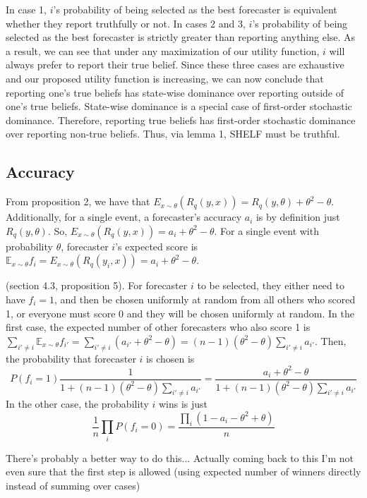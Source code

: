 \documentclass[letterpaper,12pt]{article}
\newcommand{\E}{\mathbb{E}}
\newcommand{\1}{\mathbbm{1}}
\begin{document}
In case 1, $i$'s probability of being selected as the best forecaster is equivalent whether they report truthfully or not. In cases 2 and 3, $i$'s probability of being selected as the best forecaster is strictly greater than reporting anything else. As a result, we can see that under any maximization of our utility function, $i$ will always prefer to report their true belief. Since these three cases are exhaustive and our proposed utility function is increasing, we can now conclude that reporting one's true beliefs has state-wise dominance over reporting outside of one's true beliefs. State-wise dominance is a special case of first-order stochastic dominance. Therefore, reporting true beliefs has first-order stochastic dominance over reporting non-true beliefs. Thus, via lemma 1, SHELF must be truthful.

\subsection{Accuracy}

From proposition 2, we have that $E_{x \sim \theta}(R_q(y, x)) = R_q(y, \theta) + \theta^2 - \theta$. Additionally, for a single event, a forecaster's accuracy $a_i$ is by definition just $R_q(y, \theta)$. So, $E_{x \sim \theta}(R_q(y, x)) = a_i + \theta^2 - \theta$. For a single event with probability $\theta$, forecaster $i$'s expected score is $\E_{x \sim \theta} f_i = E_{x \sim \theta}(R_q(y_i, x)) = a_i + \theta^2 - \theta$.

(section 4.3, proposition 5).  For forecaster $i$ to be selected, they either need to have $f_i = 1$, and then be chosen uniformly at random from all others who scored 1, or everyone must score 0 and they will be chosen uniformly at random. In the first case, the expected number of other forecasters who also score 1 is $\sum_{i' \neq i} \E_{x \sim \theta} f_{i'} = \sum_{i' \neq i} (a_{i'} + \theta^2 - \theta) = (n-1) (\theta^2 - \theta) \sum_{i' \neq i} a_{i'}$. Then, the probability that forecaster $i$ is chosen is 
\[
  P(f_i = 1) \frac{1}{1 + (n-1) (\theta^2 - \theta) \sum_{i' \neq i} a_{i'}} = \frac{a_i +\theta^2 - \theta}{1 + (n-1) (\theta^2 - \theta) \sum_{i' \neq i} a_{i'}}
\]
In the other case, the probability $i$ wins is just 
\[
  \frac{1}{n} \prod_{i} P(f_i = 0) = \frac{\prod_i (1 - a_i -\theta^2 + \theta)}{n}
\]

There's probably a better way to do this... Actually coming back to this I'm not even sure that the first step is allowed (using expected number of winners directly instead of summing over cases)
\end{document}
